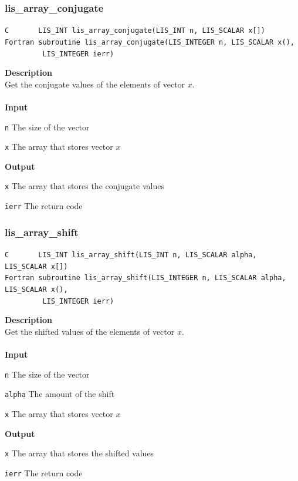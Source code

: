 \documentclass[a4paper]{article}
\newcommand{\namelistlabel}[1]{\mbox{#1}\hfill}
\newenvironment{namelist}[1]{%
\begin{list}{}
  {\let\makelabel\namelistlabel
  \settowidth{\labelwidth}{#1}
  \setlength{\leftmargin}{1.1\labelwidth}}
  }{%
\end{list}}
\begin{document}
\subsubsection{lis\_array\_conjugate}
\begin{screen}
\verb|C       LIS_INT lis_array_conjugate(LIS_INT n, LIS_SCALAR x[])|\\
\verb|Fortran subroutine lis_array_conjugate(LIS_INTEGER n, LIS_SCALAR x(),|\\
\verb|         LIS_INTEGER ierr)|
\end{screen}
{\bf Description}\\
\indent
Get the conjugate values of the elements of vector $x$.
\\ \\
\noindent
{\bf Input}
\begin{namelist}{XXXXXXXXXXXXXXXXXXXX}
\item[\tt n] The size of the vector
\item[\tt x] The array that stores vector $x$
\end{namelist}
{\bf Output}
\begin{namelist}{XXXXXXXXXXXXXXXXXXXX}
\item[\tt x] The array that stores the conjugate values
\item[\tt ierr] The return code
\end{namelist}

\newpage
\subsubsection{lis\_array\_shift}
\begin{screen}
\verb|C       LIS_INT lis_array_shift(LIS_INT n, LIS_SCALAR alpha, LIS_SCALAR x[])|\\
\verb|Fortran subroutine lis_array_shift(LIS_INTEGER n, LIS_SCALAR alpha, LIS_SCALAR x(),|\\
\verb|         LIS_INTEGER ierr)|
\end{screen}
{\bf Description}\\
\indent
Get the shifted values of the elements of vector $x$.
\\ \\
\noindent
{\bf Input}
\begin{namelist}{XXXXXXXXXXXXXXXXXXXX}
\item[\tt n] The size of the vector
\item[\tt alpha] The amount of the shift
\item[\tt x] The array that stores vector $x$
\end{namelist}
{\bf Output}
\begin{namelist}{XXXXXXXXXXXXXXXXXXXX}
\item[\tt x] The array that stores the shifted values
\item[\tt ierr] The return code
\end{namelist}
\end{document}
